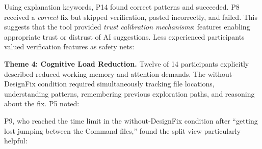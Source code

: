 

\noindent Using explanation keywords, P14 found correct patterns and succeeded. P8 received a \textit{correct} fix but skipped verification, pasted incorrectly, and failed.
This suggests that the tool provided \textit{trust calibration mechanisms}: features enabling appropriate trust or distrust of AI suggestions. Less experienced participants valued verification features as safety nets:


\textbf{Theme 4: Cognitive Load Reduction.} Twelve of 14 participants explicitly described reduced working memory and attention demands. The without-DesignFix condition required simultaneously tracking file locations, understanding patterns, remembering previous exploration paths, and reasoning about the fix. P5 noted:


P9, who reached the time limit in the without-DesignFix condition after ``getting lost jumping between the Command files,'' found the split view particularly helpful: 



